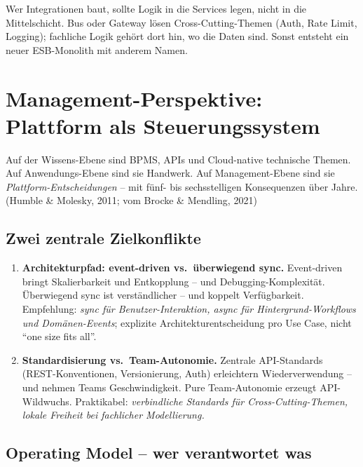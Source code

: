\documentclass[11pt,a4paper,oneside]{article}
\newcommand{\quelle}[1]{{\footnotesize\color{lpGray}(#1)}}
\begin{document}
\begin{merkbox}
Wer Integrationen baut, sollte Logik in die Services legen, nicht in die Mittelschicht. Bus oder Gateway lösen Cross-Cutting-Themen (Auth, Rate Limit, Logging); fachliche Logik gehört dort hin, wo die Daten sind. Sonst entsteht ein neuer ESB-Monolith mit anderem Namen.
\end{merkbox}

\section{Management-Perspektive: Plattform als Steuerungssystem}

Auf der Wissens-Ebene sind BPMS, APIs und Cloud-native technische Themen. Auf Anwendungs-Ebene sind sie Handwerk. Auf Management-Ebene sind sie \emph{Plattform-Entscheidungen} -- mit fünf- bis sechsstelligen Konsequenzen über Jahre. \quelle{Humble \& Molesky, 2011; vom Brocke \& Mendling, 2021}

\subsection{Zwei zentrale Zielkonflikte}

\begin{enumerate}
  \item \textbf{Architekturpfad: event-driven vs.\ überwiegend sync.} Event-driven bringt Skalierbarkeit und Entkopplung -- und Debugging-Komplexität. Überwiegend sync ist verständlicher -- und koppelt Verfügbarkeit. Empfehlung: \emph{sync für Benutzer-Interaktion, async für Hintergrund-Workflows und Domänen-Events}; explizite Architekturentscheidung pro Use Case, nicht ``one size fits all''.
  \item \textbf{Standardisierung vs.\ Team-Autonomie.} Zentrale API-Standards (REST-Konventionen, Versionierung, Auth) erleichtern Wiederverwendung -- und nehmen Teams Geschwindigkeit. Pure Team-Autonomie erzeugt API-Wildwuchs. Praktikabel: \emph{verbindliche Standards für Cross-Cutting-Themen, lokale Freiheit bei fachlicher Modellierung.}
\end{enumerate}

\subsection{Operating Model -- wer verantwortet was}
\end{document}
